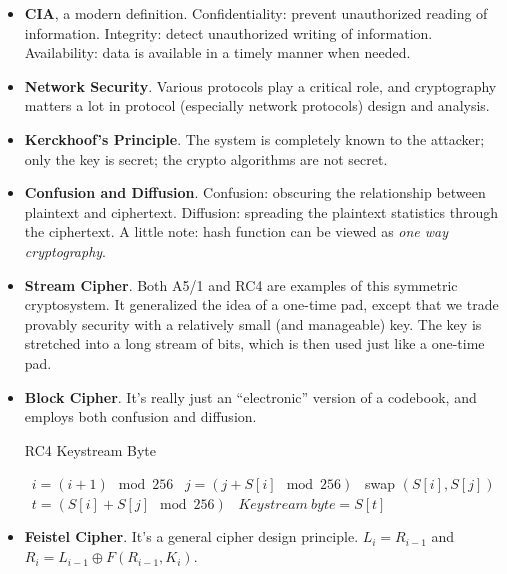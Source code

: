 \documentclass[twocolumn]{article}
\begin{document}
\begin{itemize}
\item \textbf{CIA}, a modern definition. Confidentiality: prevent
  unauthorized reading of information. Integrity: detect unauthorized
  writing of information. Availability: data is available in a timely
  manner when needed. 
\item \textbf{Network Security}. Various protocols play a critical
  role, and cryptography matters a lot in protocol (especially network
  protocols) design and analysis.
\item \textbf{Kerckhoof's Principle}. The system is completely known
  to the attacker; only the key is secret; the crypto algorithms are
  not secret. 
\item \textbf{Confusion and Diffusion}. Confusion: obscuring the
  relationship between plaintext and ciphertext. Diffusion: spreading
  the plaintext statistics through the ciphertext. A little note: hash
  function can be viewed as \emph{one way cryptography}.
\item \textbf{Stream Cipher}. Both A5/1 and RC4 are examples of this
  symmetric cryptosystem. It generalized the idea of a one-time pad,
  except that we trade provably security with a relatively small (and
  manageable) key. The key is stretched into a long stream of bits,
  which is then used just like a one-time pad. 
\item \textbf{Block Cipher}. It's really just an ``electronic''
  version of a codebook, and employs both confusion and diffusion. 
  \begin{algorithm}
    \caption{RC4 Keystream Byte}
    \label{algo:rc4-keystream-byte}
    \begin{algorithmic}
      \STATE~$i=(i+1)\mod 256$
      \STATE~$j=(j+S[i]\mod 256)$
      \STATE~swap $(S[i], S[j])$
      \STATE~$t=(S[i]+S[j]\mod 256)$
      \STATE~$Keystream~ byte=S[t]$
    \end{algorithmic}
  \end{algorithm}
\item \textbf{Feistel Cipher}. It's a general cipher design
  principle. $L_{i}=R_{i-1}$ and $R_{i}=L_{i-1}\oplus
  F(R_{i-1},K_{i})$.

\end{itemize}
\end{document}
